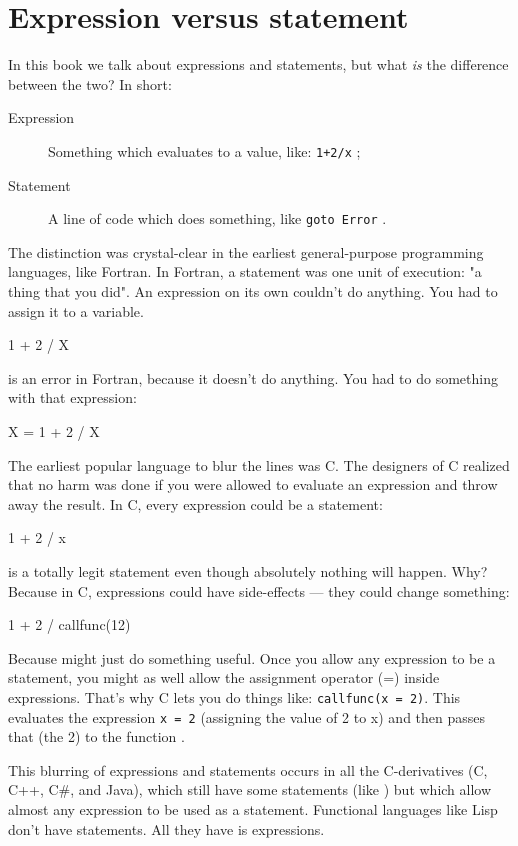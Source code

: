 \section{Expression versus statement}
\label{sec:expression versus statement}
In this book we talk about expressions and statements, but%
what \emph{is} the difference between the two?
In short:
\begin{description}
\item[Expression] Something which evaluates to a value, like:
\lstinline{1+2/x} ;
\item[Statement] A line of code which does something, like
\lstinline{goto Error} .
\end{description}



The distinction was crystal-clear in the earliest general-purpose
programming languages, like Fortran. In Fortran, a statement was one
unit of execution: "a thing that you did". 
An expression on its own couldn't do anything. You had to assign it to a
variable.
\begin{display}
1 + 2 / X
\end{display}
is an error in Fortran, because it doesn't do anything. You had to do
something with that expression: 
\begin{display}{X = 1 + 2 / X}\end{display}

The earliest popular language to blur the lines was C. The designers of
C realized that no harm was done if you were allowed to evaluate an
expression and throw away the result. In C, every expression could be a
statement: 
\begin{display}1 + 2 / x\end{display}
is a totally legit statement even though absolutely nothing will happen.
Why? Because in C, expressions could have side-effects --- they could
change something: \begin{display}{1 + 2 / callfunc(12)}\end{display}

Because  might just do something useful.
Once you allow any expression to be a statement, you might as well allow
the assignment operator (=) inside expressions. That's why C lets you do
things like: \lstinline{callfunc(x = 2)}.
This evaluates the expression \lstinline{x = 2} (assigning the value of 2 to x) and
then passes that (the 2) to the function .

This blurring of expressions and statements occurs in all the
C-derivatives (C, C++, C\#, and Java), which still have some
statements (like ) but which allow almost any expression to be used
as a statement. Functional languages like Lisp don't have statements.
All they have is expressions. 
